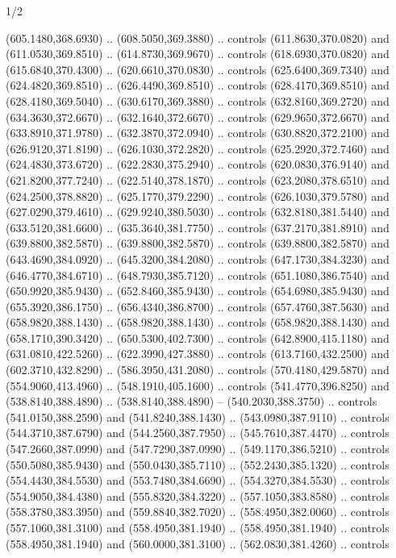 \begin{flagdescription}{1/2}
\begin{scope}[xshift=0.5\flaglength,yshift=0.5\flagwidth,scale=\flagwidth/759]
\begin{scope}[y=0.8pt, x=0.8pt, yscale=-1,shift={(-720,-480)}]
\begin{scope}[cm={{1.14637,0.0,0.0,1.17117,(33.17849,82.1384)}}]
  (605.1480,368.6930) .. (608.5050,369.3880) .. controls (611.8630,370.0820) and
  (611.0530,369.8510) .. (614.8730,369.9670) .. controls (618.6930,370.0820) and
  (615.6840,370.4300) .. (620.6610,370.0830) .. controls (625.6400,369.7340) and
  (624.4820,369.8510) .. (626.4490,369.8510) .. controls (628.4170,369.8510) and
  (628.4180,369.5040) .. (630.6170,369.3880) .. controls (632.8160,369.2720) and
  (634.3630,372.6670) .. (632.1640,372.6670) .. controls (629.9650,372.6670) and
  (633.8910,371.9780) .. (632.3870,372.0940) .. controls (630.8820,372.2100) and
  (626.9120,371.8190) .. (626.1030,372.2820) .. controls (625.2920,372.7460) and
  (624.4830,373.6720) .. (622.2830,375.2940) .. controls (620.0830,376.9140) and
  (621.8200,377.7240) .. (622.5140,378.1870) .. controls (623.2080,378.6510) and
  (624.2500,378.8820) .. (625.1770,379.2290) .. controls (626.1030,379.5780) and
  (627.0290,379.4610) .. (629.9240,380.5030) .. controls (632.8180,381.5440) and
  (633.5120,381.6600) .. (635.3640,381.7750) .. controls (637.2170,381.8910) and
  (639.8800,382.5870) .. (639.8800,382.5870) .. controls (639.8800,382.5870) and
  (643.4690,384.0920) .. (645.3200,384.2080) .. controls (647.1730,384.3230) and
  (646.4770,384.6710) .. (648.7930,385.7120) .. controls (651.1080,386.7540) and
  (650.9920,385.9430) .. (652.8460,385.9430) .. controls (654.6980,385.9430) and
  (655.3920,386.1750) .. (656.4340,386.8700) .. controls (657.4760,387.5630) and
  (658.9820,388.1430) .. (658.9820,388.1430) .. controls (658.9820,388.1430) and
  (658.1710,390.3420) .. (650.5300,402.7300) .. controls (642.8900,415.1180) and
  (631.0810,422.5260) .. (622.3990,427.3880) .. controls (613.7160,432.2500) and
  (602.3710,432.8290) .. (586.3950,431.2080) .. controls (570.4180,429.5870) and
  (554.9060,413.4960) .. (548.1910,405.1600) .. controls (541.4770,396.8250) and
  (538.8140,388.4890) .. (538.8140,388.4890) -- (540.2030,388.3750) .. controls
  (541.0150,388.2590) and (541.8240,388.1430) .. (543.0980,387.9110) .. controls
  (544.3710,387.6790) and (544.2560,387.7950) .. (545.7610,387.4470) .. controls
  (547.2660,387.0990) and (547.7290,387.0990) .. (549.1170,386.5210) .. controls
  (550.5080,385.9430) and (550.0430,385.7110) .. (552.2430,385.1320) .. controls
  (554.4430,384.5530) and (553.7480,384.6690) .. (554.3270,384.5530) .. controls
  (554.9050,384.4380) and (555.8320,384.3220) .. (557.1050,383.8580) .. controls
  (558.3780,383.3950) and (559.8840,382.7020) .. (558.4950,382.0060) .. controls
  (557.1060,381.3100) and (558.4950,381.1940) .. (558.4950,381.1940) .. controls
  (558.4950,381.1940) and (560.0000,381.3100) .. (562.0830,381.4260) .. controls

\end{scope}
\end{scope}
\end{scope}
\end{flagdescription}
